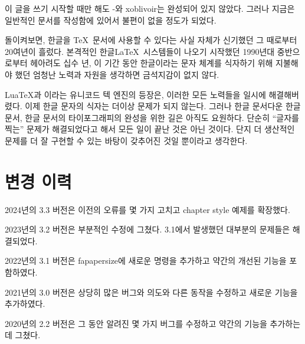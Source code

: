 \documentclass[
	12pt,
	a4paper,
	kosection,
	footnote,
	nobookmarks,
	microtype,
	figtabcapt,
]{oblivoir}
\newcommand\xobclass{x\-ob\-liv\-oir\oblivoirallowbreak}
\def\xetexko{\XeTeX-\ko}
\begin{document}
이 글을 쓰기 시작할 때만 해도 \xetexko{}와 \xobclass{}는
완성되어 있지 않았다. 그러나 지금은 일반적인 문서를 작성함에 있어서
불편이 없을 정도가 되었다.

\bigskip

돌이켜보면, 한글을 \TeX\ 문서에 사용할 수 있다는 사실 자체가
신기했던 그 때로부터 20여년이 흘렀다. 본격적인 한글\LaTeX\ 시스템들이
나오기 시작했던 1990년대 중반으로부터 헤아려도 십수 년,
이 기간 동안 한글이라는 문자 체계를 식자하기 위해 지불해야 했던
엄청난 노력과 자원을 생각하면 금석지감이 없지 않다.

Lua\TeX 과 \XeTeX 이라는 유니코드 텍 엔진의 등장은, 이러한 모든
노력들을 일시에 해결해버렸다. 이제 한글 문자의 식자는 더이상
문제가 되지 않는다.
그러나 한글 문서다운 한글 문서, 한글 문서의 타이포그래피의 완성을
위한 길은 아직도 요원하다. 단순히 “글자를 찍는” 문제가 해결되었다고
해서 모든 일이 끝난 것은 아닌 것이다. 단지 더 생산적인 문제를
더 잘 구현할 수 있는 바탕이 갖추어진 것일 뿐이라고 생각한다.


\section{변경 이력}

\noindent
2024년의 3.3 버전은 이전의 오류를 몇 가지 고치고 chapter style 예제를 확장했다.

\noindent
2023년의 3.2 버전은 부분적인 수정에 그쳤다. 3.1에서 발생했던 대부분의
문제들은 해결되었다.

\noindent
2022년의 3.1 버전은 fapapersize에 새로운 명령을 추가하고 약간의
개선된 기능을 포함하였다. 

\noindent
2021년의 3.0 버전은 상당히 많은 버그와 의도와 다른 동작을 수정하고 새로운 
기능을 추가하였다.

\noindent
2020년의 2.2 버전은 그 동안 알려진 몇 가지 버그를 수정하고 약간의 기능을
추가하는 데 그쳤다.




\end{document}
